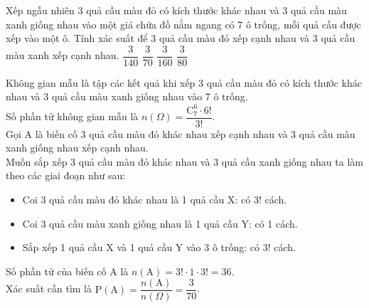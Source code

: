 \begin{ex}%
Xếp ngẫu nhiên 3 quả cầu màu đỏ có kích thước khác nhau và 3 quả cầu màu xanh giống nhau vào một giá chứa đồ nằm ngang có 7 ô trống, mỗi quả cầu được xếp vào một ô. Tính xác suất để 3 quả cầu màu đỏ xếp cạnh nhau và 3 quả cầu màu xanh xếp cạnh nhau.
\choice
{$\dfrac{3}{140}$}
{\True $\dfrac{3}{70}$}
{$\dfrac{3}{160}$}
{$\dfrac{3}{80}$}
\loigiai
{Không gian mẫu là tập các kết quả khi xếp 3 quả cầu màu đỏ có kích thước khác nhau và 3 quả cầu màu xanh giống nhau vào 7 ô trống.\\
Số phần tử không gian mẫu là $n(\Omega)=\dfrac{\mathrm{C}_7^6\cdot 6!}{3!}$.\\
Gọi A là biến cố 3 quả cầu màu đỏ khác nhau xếp cạnh nhau và 3 quả cầu màu xanh giống nhau xếp cạnh nhau.\\
Muốn sắp xếp 3 quả cầu màu đỏ khác nhau và 3 quả cầu xanh giống nhau ta làm theo các giai đoạn như sau:
\begin{itemize}
\item Coi 3 quả cầu màu đỏ khác nhau là 1 quả cầu X: có $3!$ cách.
\item Coi 3 quả cầu màu xanh giống nhau là 1 quả cầu Y: có 1 cách.
\item Sắp xếp 1 quả cầu X và 1 quả cầu Y vào 3 ô trống: có 3! cách.
\end{itemize}
Số phần tử của biến cố A là $n(\text{A})=3!\cdot 1\cdot 3!=36$.\\
Xác suất cần tìm là $\mathrm{P}(\text{A})=\dfrac{n(\text{A})}{n(\Omega)}=\dfrac{3}{70}$.
}
\end{ex}

